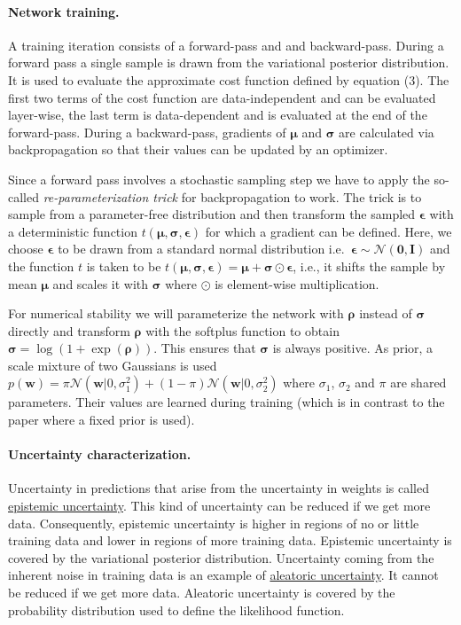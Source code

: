 \documentclass[%
oneside,                 %
final,                   %
10pt]{article}
\begin{document}
\paragraph{Network training.}
A training iteration consists of a forward-pass and and backward-pass. During a forward pass a single sample is drawn from the variational posterior distribution. It is used to evaluate the approximate cost function defined by equation (3). The first two terms of the cost function are data-independent and can be evaluated layer-wise, the last term is data-dependent and is evaluated at the end of the forward-pass. During a backward-pass, gradients of $\boldsymbol{\mu}$ and $\boldsymbol{\sigma}$ are calculated via backpropagation so that their values can be updated by an optimizer.

Since a forward pass involves a stochastic sampling step we have to apply the so-called \emph{re-parameterization trick} for backpropagation to work. The trick is to sample from a parameter-free distribution and then transform the sampled $\boldsymbol{\epsilon}$ with a deterministic function $t(\boldsymbol{\mu}, \boldsymbol{\sigma}, \boldsymbol{\epsilon})$ for which a gradient can be defined. Here, we choose $\boldsymbol{\epsilon}$ to be drawn from a standard normal distribution i.e.~$\boldsymbol{\epsilon} \sim \mathcal{N}(\mathbf{0}, \mathbf{I})$ and the function $t$ is taken to be $t(\boldsymbol{\mu}, \boldsymbol{\sigma}, \boldsymbol{\epsilon}) = \boldsymbol{\mu} + \boldsymbol{\sigma} \odot \boldsymbol{\epsilon}$, i.e., it shifts the sample by mean $\boldsymbol{\mu}$ and scales it with $\boldsymbol{\sigma}$ where $\odot$ is element-wise multiplication.

For numerical stability we will parameterize the network with $\boldsymbol{\rho}$ instead of $\boldsymbol{\sigma}$ directly and transform $\boldsymbol{\rho}$ with the softplus function to obtain $\boldsymbol{\sigma} = \log(1 + \exp(\boldsymbol{\rho}))$. This ensures that $\boldsymbol{\sigma}$ is always positive. As prior, a scale mixture of two Gaussians is used $p(\mathbf{w}) = \pi \mathcal{N}(\mathbf{w} \lvert 0,\sigma_1^2) + (1 - \pi) \mathcal{N}(\mathbf{w} \lvert 0,\sigma_2^2)$ where $\sigma_1$, $\sigma_2$ and $\pi$ are shared parameters. Their values are learned during training (which is in contrast to the paper where a fixed prior is used).
\paragraph{Uncertainty characterization.}
Uncertainty in predictions that arise from the uncertainty in weights is called \href{{https://en.wikipedia.org/wiki/Uncertainty_quantification}}{epistemic uncertainty}. This kind of uncertainty can be reduced if we get more data. Consequently,  epistemic uncertainty is higher in regions of no or little training data and lower in regions of more training data. Epistemic uncertainty is covered by the variational posterior distribution. Uncertainty coming from the inherent noise in training data is an example of \href{{https://en.wikipedia.org/wiki/Uncertainty_quantification}}{aleatoric uncertainty}. It cannot be reduced if we get more data. Aleatoric uncertainty is covered by the probability distribution used to define the likelihood function.


\end{document}

